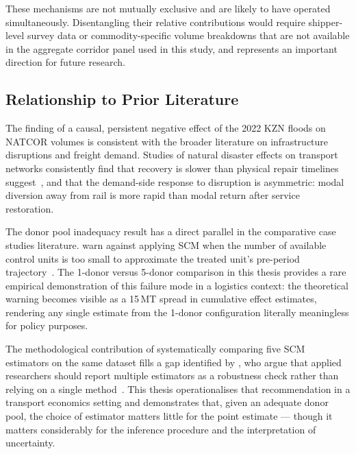 These mechanisms are not mutually exclusive and are likely to have
operated simultaneously.
Disentangling their relative contributions would require
shipper-level survey data or commodity-specific volume breakdowns
that are not available in the aggregate corridor panel used in
this study, and represents an important direction for future
research.

\subsection{Relationship to Prior Literature}
\label{sec:disc_lit}

The finding of a causal, persistent negative effect of the 2022
KZN floods on NATCOR volumes is consistent with the broader
literature on infrastructure disruptions and freight demand.
Studies of natural disaster effects on transport networks
consistently find that recovery is slower than physical repair
timelines suggest~\parencite{cavallo2013}, and that the demand-side
response to disruption is asymmetric: modal diversion away from
rail is more rapid than modal return after service restoration.

The donor pool inadequacy result has a direct parallel in the
comparative case studies literature.
\textcite{abadie2003} warn against applying SCM when the number
of available control units is too small to approximate the treated
unit's pre-period trajectory~\parencite{abadie2003}.
The 1-donor versus 5-donor comparison in this thesis provides a
rare empirical demonstration of this failure mode in a logistics
context: the theoretical warning becomes visible as a 15\,MT
spread in cumulative effect estimates, rendering any single estimate
from the 1-donor configuration literally meaningless for policy
purposes.

The methodological contribution of systematically comparing five
SCM estimators on the same dataset fills a gap identified by
\textcite{benmichael2021}, who argue that applied researchers
should report multiple estimators as a robustness check rather
than relying on a single method~\parencite{benmichael2021}.
This thesis operationalises that recommendation in a transport
economics setting and demonstrates that, given an adequate donor
pool, the choice of estimator matters little for the point estimate
--- though it matters considerably for the inference procedure and
the interpretation of uncertainty.

